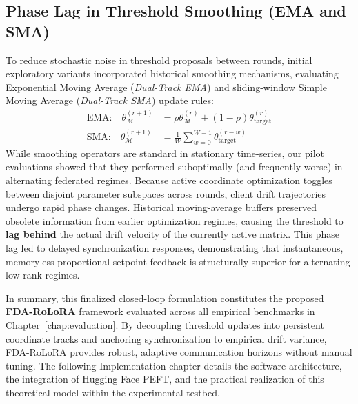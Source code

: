 \subsection{Phase Lag in Threshold Smoothing (EMA and SMA)}
To reduce stochastic noise in threshold proposals between rounds, initial exploratory variants incorporated historical smoothing mechanisms, evaluating Exponential Moving Average (\textit{Dual-Track EMA}) and sliding-window Simple Moving Average (\textit{Dual-Track SMA}) update rules:
\begin{align*}
    \text{EMA:} \quad \theta_{\mathcal{M}}^{(r+1)} &= \rho \theta_{\mathcal{M}}^{(r)} + (1 - \rho) \theta_{\text{target}}^{(r)} \\
    \text{SMA:} \quad \theta_{\mathcal{M}}^{(r+1)} &= \frac{1}{W} \sum_{w=0}^{W-1} \theta_{\text{target}}^{(r-w)}
\end{align*}
While smoothing operators are standard in stationary time-series, our pilot evaluations showed that they performed suboptimally (and frequently worse) in alternating federated regimes. Because active coordinate optimization toggles between disjoint parameter subspaces across rounds, client drift trajectories undergo rapid phase changes. Historical moving-average buffers preserved obsolete information from earlier optimization regimes, causing the threshold to \textbf{lag behind} the actual drift velocity of the currently active matrix. This phase lag led to delayed synchronization responses, demonstrating that instantaneous, memoryless proportional setpoint feedback is structurally superior for alternating low-rank regimes.

In summary, this finalized closed-loop formulation constitutes the proposed \textbf{FDA-RoLoRA} framework evaluated across all empirical benchmarks in Chapter~\ref{chap:evaluation}. By decoupling threshold updates into persistent coordinate tracks and anchoring synchronization to empirical drift variance, FDA-RoLoRA provides robust, adaptive communication horizons without manual tuning. The following Implementation chapter details the software architecture, the integration of Hugging Face PEFT, and the practical realization of this theoretical model within the experimental testbed.
